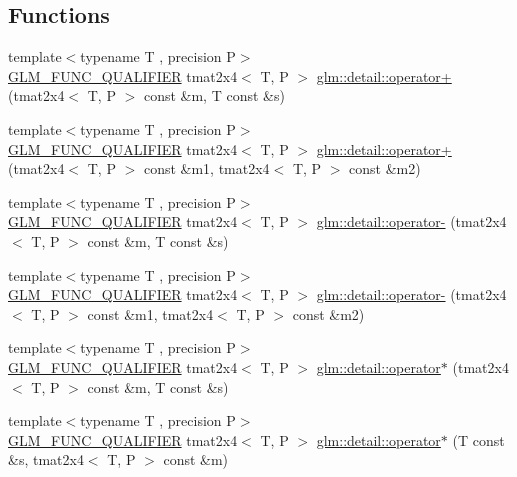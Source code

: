 \subsection*{Functions}
\begin{DoxyCompactItemize}
\item 
{\footnotesize template$<$typename T , precision P$>$ }\\\hyperlink{setup_8hpp_a33fdea6f91c5f834105f7415e2a64407}{G\+L\+M\+\_\+\+F\+U\+N\+C\+\_\+\+Q\+U\+A\+L\+I\+F\+I\+ER} tmat2x4$<$ T, P $>$ \hyperlink{namespaceglm_1_1detail_ace23fee0de0f44999542cef5e7947d4b}{glm\+::detail\+::operator+} (tmat2x4$<$ T, P $>$ const \&m, T const \&s)
\item 
{\footnotesize template$<$typename T , precision P$>$ }\\\hyperlink{setup_8hpp_a33fdea6f91c5f834105f7415e2a64407}{G\+L\+M\+\_\+\+F\+U\+N\+C\+\_\+\+Q\+U\+A\+L\+I\+F\+I\+ER} tmat2x4$<$ T, P $>$ \hyperlink{namespaceglm_1_1detail_a11cf4cd33af030c4aff03f1b2657e0a0}{glm\+::detail\+::operator+} (tmat2x4$<$ T, P $>$ const \&m1, tmat2x4$<$ T, P $>$ const \&m2)
\item 
{\footnotesize template$<$typename T , precision P$>$ }\\\hyperlink{setup_8hpp_a33fdea6f91c5f834105f7415e2a64407}{G\+L\+M\+\_\+\+F\+U\+N\+C\+\_\+\+Q\+U\+A\+L\+I\+F\+I\+ER} tmat2x4$<$ T, P $>$ \hyperlink{namespaceglm_1_1detail_a2b5028f258e26d47c244a82742f22229}{glm\+::detail\+::operator-\/} (tmat2x4$<$ T, P $>$ const \&m, T const \&s)
\item 
{\footnotesize template$<$typename T , precision P$>$ }\\\hyperlink{setup_8hpp_a33fdea6f91c5f834105f7415e2a64407}{G\+L\+M\+\_\+\+F\+U\+N\+C\+\_\+\+Q\+U\+A\+L\+I\+F\+I\+ER} tmat2x4$<$ T, P $>$ \hyperlink{namespaceglm_1_1detail_a62c0654cf823ed2b6b13c5f6f184665b}{glm\+::detail\+::operator-\/} (tmat2x4$<$ T, P $>$ const \&m1, tmat2x4$<$ T, P $>$ const \&m2)
\item 
{\footnotesize template$<$typename T , precision P$>$ }\\\hyperlink{setup_8hpp_a33fdea6f91c5f834105f7415e2a64407}{G\+L\+M\+\_\+\+F\+U\+N\+C\+\_\+\+Q\+U\+A\+L\+I\+F\+I\+ER} tmat2x4$<$ T, P $>$ \hyperlink{namespaceglm_1_1detail_af7db55aedd930092912bb09ff85e2611}{glm\+::detail\+::operator$\ast$} (tmat2x4$<$ T, P $>$ const \&m, T const \&s)
\item 
{\footnotesize template$<$typename T , precision P$>$ }\\\hyperlink{setup_8hpp_a33fdea6f91c5f834105f7415e2a64407}{G\+L\+M\+\_\+\+F\+U\+N\+C\+\_\+\+Q\+U\+A\+L\+I\+F\+I\+ER} tmat2x4$<$ T, P $>$ \hyperlink{namespaceglm_1_1detail_a396445296290f28cf8a524b32454593f}{glm\+::detail\+::operator$\ast$} (T const \&s, tmat2x4$<$ T, P $>$ const \&m)

\end{DoxyCompactItemize}
